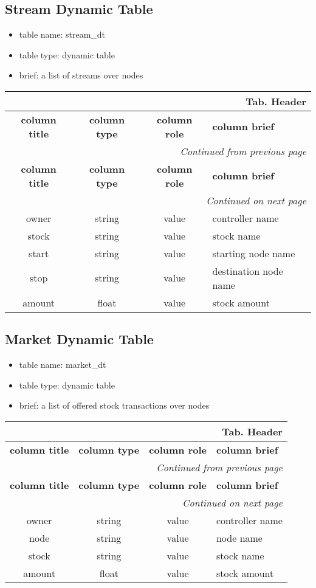 \documentclass[a4paper,oneside,titlepage]{report}
\newcommand*{\LTHeaderIV}[5]{
  \multicolumn{4}{r}{\textbf{Tab. \thesubsection} \textbf{#1}}\\    
  \hline
  \textbf{#2} & \textbf{#3} & \textbf{#4} & \textbf{#5}\\
  \hline
  
  \endfirsthead
  \multicolumn{4}{r}{\textit{Continued from previous page}}\\    
  \hline
  \textbf{#2} & \textbf{#3} & \textbf{#4} & \textbf{#5}\\
  \hline
  \endhead
  \hline
  \multicolumn{4}{r}{\textit{Continued on next page}}\\
  \endfoot
  \hline
  \endlastfoot  
}
\begin{document}
\subsection{Stream Dynamic Table}
\begin{itemize}
  \setlength{\itemsep}{0pt}
  \setlength{\parskip}{0pt}
\item table name: stream\_dt  
\item table type: dynamic table   
\item brief: a list of streams over nodes
\end{itemize}

\vspace{-0.5cm}
\begin{longtable}{ |c|c|c|l| } 
  \LTHeaderIV{Header}{column title}{column type}{column role}{column brief}                    
  owner & string & value & controller name\\
  stock & string & value & stock name\\
  start & string & value & starting node name\\
  stop & string & value & destination node name\\
  amount & float & value & stock amount \\
\end{longtable}        

\subsection{Market Dynamic Table}
\begin{itemize}
  \setlength{\itemsep}{0pt}
  \setlength{\parskip}{0pt}
\item table name: market\_dt  
\item table type: dynamic table   
\item brief: a list of offered stock transactions over nodes
\end{itemize}

\begin{longtable}{ |c|c|c|l| } 
  \LTHeaderIV{Header}{column title}{column type}{column role}{column brief}                    
  owner & string & value & controller name\\
  node & string & value & node name\\
  stock & string & value & stock name\\
  amount & float & value & stock amount\\
\end{longtable}        
\end{document}
